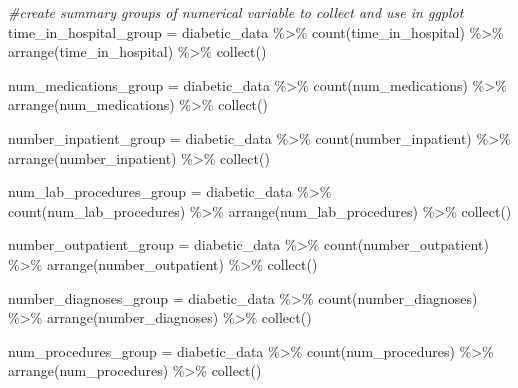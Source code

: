 \documentclass[
]{article}
\newenvironment{Shaded}{\begin{snugshade}}{\end{snugshade}}
\newcommand{\CommentTok}[1]{\textcolor[rgb]{0.56,0.35,0.01}{\textit{#1}}}
\newcommand{\FunctionTok}[1]{\textcolor[rgb]{0.00,0.00,0.00}{#1}}
\newcommand{\NormalTok}[1]{#1}
\newcommand{\OtherTok}[1]{\textcolor[rgb]{0.56,0.35,0.01}{#1}}
\newcommand{\SpecialCharTok}[1]{\textcolor[rgb]{0.00,0.00,0.00}{#1}}
\begin{document}
\begin{Shaded}
\begin{Highlighting}[]
\CommentTok{\#create summary groups of numerical variable to collect and use in ggplot}
\NormalTok{time\_in\_hospital\_group }\OtherTok{=}\NormalTok{ diabetic\_data }\SpecialCharTok{\%\textgreater{}\%} 
  \FunctionTok{count}\NormalTok{(time\_in\_hospital) }\SpecialCharTok{\%\textgreater{}\%}
  \FunctionTok{arrange}\NormalTok{(time\_in\_hospital) }\SpecialCharTok{\%\textgreater{}\%}
  \FunctionTok{collect}\NormalTok{()}

\NormalTok{num\_medications\_group }\OtherTok{=}\NormalTok{ diabetic\_data }\SpecialCharTok{\%\textgreater{}\%} 
  \FunctionTok{count}\NormalTok{(num\_medications) }\SpecialCharTok{\%\textgreater{}\%}
  \FunctionTok{arrange}\NormalTok{(num\_medications) }\SpecialCharTok{\%\textgreater{}\%}
  \FunctionTok{collect}\NormalTok{()}

\NormalTok{number\_inpatient\_group }\OtherTok{=}\NormalTok{ diabetic\_data }\SpecialCharTok{\%\textgreater{}\%} 
  \FunctionTok{count}\NormalTok{(number\_inpatient) }\SpecialCharTok{\%\textgreater{}\%}
  \FunctionTok{arrange}\NormalTok{(number\_inpatient) }\SpecialCharTok{\%\textgreater{}\%}
  \FunctionTok{collect}\NormalTok{()}

\NormalTok{num\_lab\_procedures\_group }\OtherTok{=}\NormalTok{ diabetic\_data }\SpecialCharTok{\%\textgreater{}\%} 
  \FunctionTok{count}\NormalTok{(num\_lab\_procedures) }\SpecialCharTok{\%\textgreater{}\%}
  \FunctionTok{arrange}\NormalTok{(num\_lab\_procedures) }\SpecialCharTok{\%\textgreater{}\%}
  \FunctionTok{collect}\NormalTok{()}

\NormalTok{number\_outpatient\_group }\OtherTok{=}\NormalTok{ diabetic\_data }\SpecialCharTok{\%\textgreater{}\%} 
  \FunctionTok{count}\NormalTok{(number\_outpatient) }\SpecialCharTok{\%\textgreater{}\%}
  \FunctionTok{arrange}\NormalTok{(number\_outpatient) }\SpecialCharTok{\%\textgreater{}\%}
  \FunctionTok{collect}\NormalTok{()}

\NormalTok{number\_diagnoses\_group }\OtherTok{=}\NormalTok{ diabetic\_data }\SpecialCharTok{\%\textgreater{}\%} 
  \FunctionTok{count}\NormalTok{(number\_diagnoses) }\SpecialCharTok{\%\textgreater{}\%}
  \FunctionTok{arrange}\NormalTok{(number\_diagnoses) }\SpecialCharTok{\%\textgreater{}\%}
  \FunctionTok{collect}\NormalTok{()}

\NormalTok{num\_procedures\_group }\OtherTok{=}\NormalTok{ diabetic\_data }\SpecialCharTok{\%\textgreater{}\%} 
  \FunctionTok{count}\NormalTok{(num\_procedures) }\SpecialCharTok{\%\textgreater{}\%}
  \FunctionTok{arrange}\NormalTok{(num\_procedures) }\SpecialCharTok{\%\textgreater{}\%}
  \FunctionTok{collect}\NormalTok{()}


\end{Highlighting}
\end{Shaded}
\end{document}
